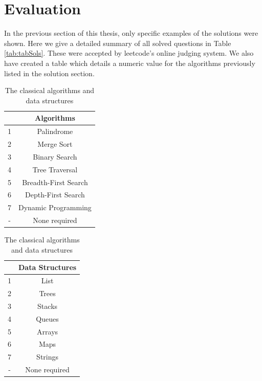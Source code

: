 \documentclass[10pt,twocolumn,hidelinks]{IEEEtran}
\begin{document}
\section{Evaluation}
In the previous section of this thesis, only specific examples of the solutions were shown. Here we give a detailed summary of all solved questions in Table \ref{tab:tabSols}. These were accepted by leetcode's online judging system. 
We also have created a table which details a numeric value for the algorithms previously listed in the solution section.
\begin{table}
\parbox{.45\linewidth}{
\centering
\begin{tabular}{|c|c|}
		    &Algorithms \\ \hline
		1 & Palindrome\\ \hline
		2 & Merge Sort\\ \hline
		3 & Binary Search\\ \hline
		4 & Tree Traversal \\ \hline
		5 & Breadth-First Search\\ \hline
		6 & Depth-First Search\\ \hline
		7 & Dynamic Programming\\ \hline
		- & None required\\ \hline
\end{tabular}
\caption{The classical algorithms and data structures}
\label{tab:classicalAlgos}
}
\hfill
\parbox{.45\linewidth}{
\centering
\begin{tabular}{|c|c|}
	&Data Structures \\ \hline
	1 & List\\ \hline
	2 & Trees\\ \hline
	3 & Stacks\\ \hline
	4 & Queues \\ \hline
	5 & Arrays\\ \hline
	6 & Maps\\ \hline	
	7&Strings\\ \hline
	-&None required\\
\end{tabular}
}
\end{table}
\end{document}
